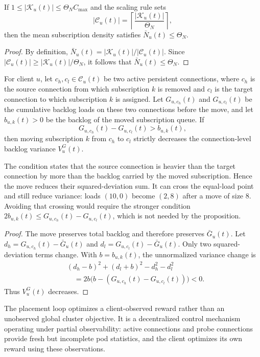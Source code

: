 \begin{proposition}
If $1\leq|\mathcal{K}_u(t)|\leq \Theta_N C_{\max}$ and the scaling rule sets
\begin{equation}
	|\mathcal{C}_u(t)| =
	\left\lceil\frac{|\mathcal{K}_u(t)|}{\Theta_N}\right\rceil,
\end{equation}
then the mean subscription density satisfies $\bar{N}_u(t)\leq\Theta_N$.
\end{proposition}

\begin{proof}
By definition, $\bar{N}_u(t)=|\mathcal{K}_u(t)|/|\mathcal{C}_u(t)|$. Since
$|\mathcal{C}_u(t)|\geq |\mathcal{K}_u(t)|/\Theta_N$, it follows that
$\bar{N}_u(t)\leq\Theta_N$.
\end{proof}

\begin{proposition}
For client $u$, let $c_h,c_l\in\mathcal{C}_u(t)$ be two active persistent
connections, where $c_h$ is the source connection from which subscription $k$
is removed and $c_l$ is the target connection to which subscription $k$ is
assigned. Let $G_{u,c_h}(t)$ and $G_{u,c_l}(t)$ be the cumulative backlog loads
on these two connections before the move, and let $b_{u,k}(t)>0$ be the backlog
of the moved subscription queue. If
\begin{equation}
	G_{u,c_h}(t)-G_{u,c_l}(t)>b_{u,k}(t),
\end{equation}
then moving subscription $k$ from $c_h$ to $c_l$ strictly decreases the
connection-level backlog variance $V^G_u(t)$.
\end{proposition}

The condition states that the source connection is heavier than the target
connection by more than the backlog carried by the moved subscription. Hence
the move reduces their squared-deviation sum. It can cross the equal-load
point and still reduce variance: loads $(10,0)$ become $(2,8)$ after a move
of size 8. Avoiding that crossing would require the stronger condition
$2b_{u,k}(t)\leq G_{u,c_h}(t)-G_{u,c_l}(t)$, which is not needed by the proposition.

\begin{proof}
The move preserves total backlog and therefore preserves $\bar{G}_u(t)$. Let
$d_h=G_{u,c_h}(t)-\bar{G}_u(t)$ and
$d_l=G_{u,c_l}(t)-\bar{G}_u(t)$. Only two squared-deviation terms change. With
$b=b_{u,k}(t)$, the unnormalized variance change is
\begin{align}
	&(d_h-b)^2+(d_l+b)^2-d_h^2-d_l^2 \nonumber\\
	&\quad =
	2b\bigl(b-(G_{u,c_h}(t)-G_{u,c_l}(t))\bigr)<0.
\end{align}
Thus $V^G_u(t)$ decreases.
\end{proof}

\begin{remark}
The placement loop optimizes a client-observed reward rather than an
unobserved global cluster objective. It is a decentralized control mechanism operating
under partial observability: active connections and probe connections provide
fresh but incomplete pod statistics, and the client optimizes its own reward
using these observations.
\end{remark}

